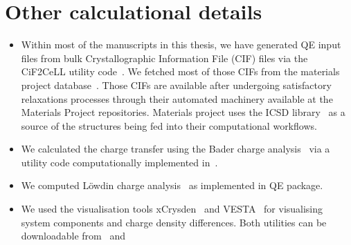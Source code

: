 \section{Other calculational details}
\begin{itemize}
    \item Within most of the manuscripts in this thesis, we have generated QE input files from bulk Crystallographic Information File (CIF) files via the CiF2CeLL utility code~\cite{Torbjorn2011, CIF2CELLlink}. We fetched most of those CIFs from the materials project database~\cite{Anubhav2013, MaterialsProjectLink}. Those CIFs are available after undergoing satisfactory relaxations processes through their automated machinery available at the Materials Project repositories. Materials project uses the ICSD library~\cite{Bergerhoff1983, ICSDLink} as a source of the structures being fed into their computational workflows.
    \item We calculated the charge transfer using the Bader charge analysis~\cite{Bader1994} via a utility code computationally implemented in~\cite{Henkelman2006, Tang2009}. 
    \item We computed Löwdin charge analysis~\cite{Lowdin1955} as implemented in QE package.
    \item We used the visualisation tools xCrysden~\cite{Kokalj1999} and VESTA~\cite{Momma2011} for visualising system components and charge density differences. Both utilities can be downloadable from~\cite{xCrysdenLink} and~\cite{VESTALink}
\end{itemize}
\endinput